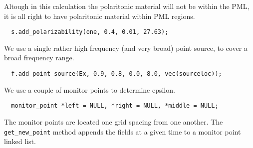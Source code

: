 \begin{comment}
const double a = 10;
const double pml_thickness = 1.0;
const double middlesize = 1.0;
const double zsize = middlesize + 2*pml_thickness;
\end{verbatim}

For our example polaritonic material, we'll use an $\epsilon(0)$ of 13.4. %

\begin{verbatim}
double eps(const vec &) { return 13.4; }
\end{verbatim}
\begin{comment}
double one(const vec &p) {
  return 1;
}

int main(int argc, char **argv) {
  initialize mpi(argc, argv);
  deal_with_ctrl_c();
  const double ttot =2000.0;
  const volume v = volone(zsize, a);
  const symmetry S = mirror(Z, v);
  structure s(v, eps, pml(pml_thickness), S);
  const char *dirname = make_output_directory(__FILE__);
  s.set_output_directory(dirname);
\end{comment}
Altough in this calculation the polaritonic material will not be within the
PML, it is all right to have polaritonic material within PML regions.
\begin{verbatim}
  s.add_polarizability(one, 0.4, 0.01, 27.63);
\end{verbatim}
\begin{comment}
  fields f(&s);
  double sourceloc = pml_thickness+1.0/(double)a;
\end{comment}
We use a single rather high frequency (and very broad) point source, to
cover a broad frequency range.
\begin{verbatim}
  f.add_point_source(Ex, 0.9, 0.8, 0.0, 8.0, vec(sourceloc));
\end{verbatim}
We use a couple of monitor points to determine epsilon.
\begin{verbatim}
  monitor_point *left = NULL, *right = NULL, *middle = NULL;
\end{verbatim}
\begin{comment}
  double next_printtime = 100;
  while (f.time() <= ttot && !interrupt) {
    if (f.time() >= next_printtime) {
      next_printtime += 100;
      master_printf("Working on time %
      master_printf("energy is %
    }
\end{comment}
The monitor points are located one grid spacing from one another.  The
\verb*|get_new_point| method appends the fields at a given time to a
monitor point linked list.

